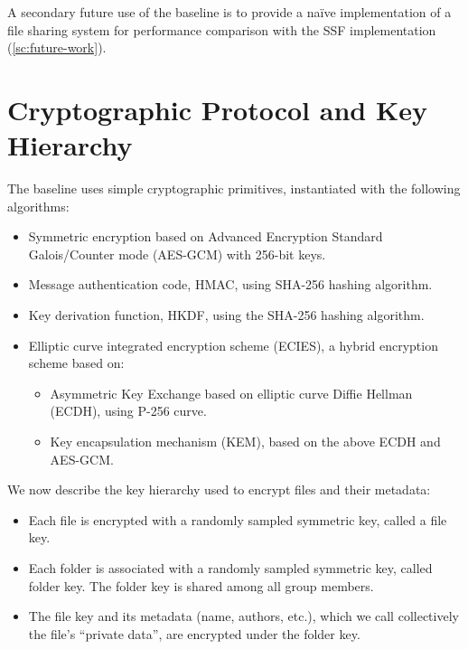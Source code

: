 A secondary future use of the baseline is to provide a
na\"ive implementation of a file sharing system 
for performance comparison with the SSF implementation (\cref{sc:future-work}). 

\section{Cryptographic Protocol and Key Hierarchy}\label{sc:baseline-protocol-hierarcy}

The baseline uses simple cryptographic primitives, instantiated with the following algorithms:
\begin{itemize}
    \item Symmetric encryption based on Advanced Encryption Standard Galois/Counter mode (AES-GCM) with 256-bit keys.
    \item Message authentication code, HMAC, using SHA-256 hashing algorithm. 
    \item Key derivation function, HKDF, using the SHA-256 hashing algorithm.
    \item Elliptic curve integrated encryption scheme (ECIES), a hybrid encryption scheme based on:
    \begin{itemize}
        \item Asymmetric Key Exchange based on elliptic curve Diffie Hellman (ECDH), using P-256 curve.
        \item Key encapsulation mechanism (KEM), based on the above ECDH and AES-GCM.    
    \end{itemize}
\end{itemize}

We now describe the key hierarchy used to encrypt files and their metadata:
\begin{itemize}
    \item Each file is encrypted with a randomly sampled symmetric key, called a file key.
    \item Each folder is associated with a randomly sampled symmetric key, called folder key. The folder key is shared among all group members.
    \item The file key and its metadata (name, authors, etc.), which we call collectively the file's ``private data'', are encrypted under the folder key.
\end{itemize}

